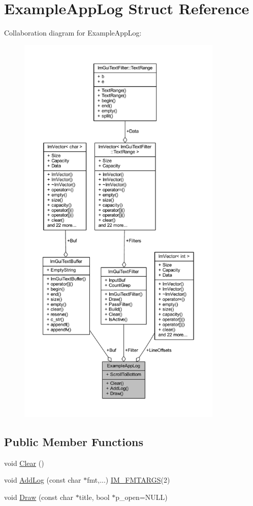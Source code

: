\hypertarget{struct_example_app_log}{}\section{Example\+App\+Log Struct Reference}
\label{struct_example_app_log}


Collaboration diagram for Example\+App\+Log\+:
\nopagebreak
\begin{figure}[H]
\begin{center}
\leavevmode
\includegraphics[height=550pt]{struct_example_app_log__coll__graph}
\end{center}
\end{figure}
\subsection*{Public Member Functions}
\begin{DoxyCompactItemize}
\item 
void \mbox{\hyperlink{struct_example_app_log_ab9c298defddbb106fdfe4ab16c5eebac}{Clear}} ()
\item 
void \mbox{\hyperlink{struct_example_app_log_afd296fb3b2559acd341fd92883f8f571}{Add\+Log}} (const char $\ast$fmt,...) \mbox{\hyperlink{imgui_8h_a1251c2f9ddac0873dbad8181bd82c9f1}{I\+M\+\_\+\+F\+M\+T\+A\+R\+GS}}(2)
\item 
void \mbox{\hyperlink{struct_example_app_log_a5ad3a4bdb89171b84aeaff96948a1f77}{Draw}} (const char $\ast$title, bool $\ast$p\+\_\+open=N\+U\+LL)
\end{DoxyCompactItemize}
